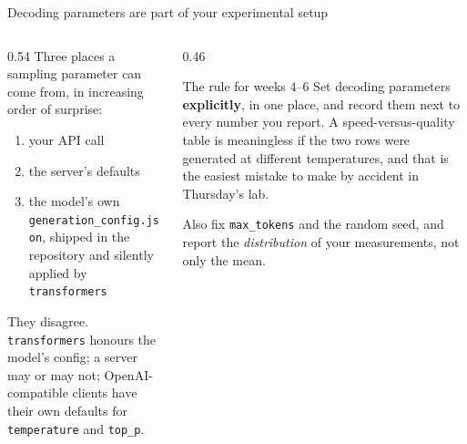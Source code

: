 \documentclass[aspectratio=169,10pt]{beamer}
\begin{document}
\begin{frame}{Decoding parameters are part of your experimental setup}
  \begin{columns}[T]
    \begin{column}{0.54\textwidth}
      Three places a sampling parameter can come from, in increasing order of
      surprise:
      \begin{enumerate}
        \item your API call
        \item the server's defaults
        \item the model's own \texttt{generation\_config.json}, shipped in the
          repository and silently applied by \texttt{transformers}
      \end{enumerate}
      \vspace{0.5em}
      They disagree. \texttt{transformers} honours the model's config; a server
      may or may not; OpenAI-compatible clients have their own defaults for
      \texttt{temperature} and \texttt{top\_p}.
    \end{column}
    \begin{column}{0.46\textwidth}
      \begin{block}{The rule for weeks 4--6}
        \small
        Set decoding parameters \textbf{explicitly}, in one place, and record
        them next to every number you report.
        \vspace{0.4em}
        A speed-versus-quality table is meaningless if the two rows were
        generated at different temperatures, and that is the easiest mistake
        to make by accident in Thursday's lab.
      \end{block}
      \vspace{0.3em}
      \small
      Also fix \texttt{max\_tokens} and the random seed, and report the
      \emph{distribution} of your measurements, not only the mean.
    \end{column}
  \end{columns}
\end{frame}
\end{document}
